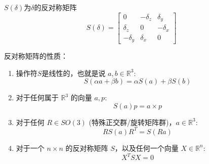 \begin{note}
    $S(\delta)$为$\delta$的反对称矩阵
    $$
    S(\delta) = \begin{bmatrix} 
    0 & -\delta_z & \delta_y \\ 
    \delta_z & 0 & -\delta_x \\ 
    -\delta_y & \delta_x & 0 
    \end{bmatrix}
    $$

    反对称矩阵的性质：
    \begin{enumerate}
        \item 操作符$S$是线性的，也就是说 $a, b \in \mathbb{R}^3$:
        \[ S(\alpha a + \beta b) = \alpha S(a) + \beta S(b) \]
        \item 对于任何属于 $\mathbb{R}^3$ 的向量 $a, p$:
        \[ S(a)p = a \times p \]
        \item 对于任何 $R \in SO(3)$ (特殊正交群/旋转矩阵群)，$a \in \mathbb{R}^3$:
        \[ R S(a) R^T = S(Ra) \]
        \item 对于一个 $n \times n$ 的反对称矩阵 $S$，以及任何一个向量 $X \in \mathbb{R}^n$:
        \[ X^T S X = 0 \]
    \end{enumerate}
\end{note}

